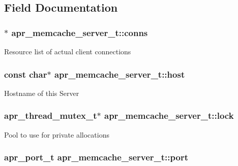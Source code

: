 \subsection{Field Documentation}
\hypertarget{structapr__memcache__server__t_a49f27525b9dd7de3dfb15dba3b86bd05}{
\subsubsection[{conns}]{$\ast$ apr\-\_\-memcache\-\_\-server\-\_\-t\-::conns}}\label{structapr__memcache__server__t_a49f27525b9dd7de3dfb15dba3b86bd05}
Resource list of actual client connections \hypertarget{structapr__memcache__server__t_a3f0cbe5cde09d28791f8a8950258b305}{
\subsubsection[{host}]{\setlength{\rightskip}{0pt plus 5cm}const char$\ast$ apr\-\_\-memcache\-\_\-server\-\_\-t\-::host}}\label{structapr__memcache__server__t_a3f0cbe5cde09d28791f8a8950258b305}
Hostname of this Server \hypertarget{structapr__memcache__server__t_aab472a87e5f0abe993e565a8e3a72490}{
\subsubsection[{lock}]{\setlength{\rightskip}{0pt plus 5cm}apr\-\_\-thread\-\_\-mutex\-\_\-t$\ast$ apr\-\_\-memcache\-\_\-server\-\_\-t\-::lock}}\label{structapr__memcache__server__t_aab472a87e5f0abe993e565a8e3a72490}
Pool to use for private allocations \hypertarget{structapr__memcache__server__t_aade2ee234b229b6711a80fe2a3de853b}{
\subsubsection[{port}]{\setlength{\rightskip}{0pt plus 5cm}apr\-\_\-port\-\_\-t apr\-\_\-memcache\-\_\-server\-\_\-t\-::port}}\label{structapr__memcache__server__t_aade2ee234b229b6711a80fe2a3de853b}
